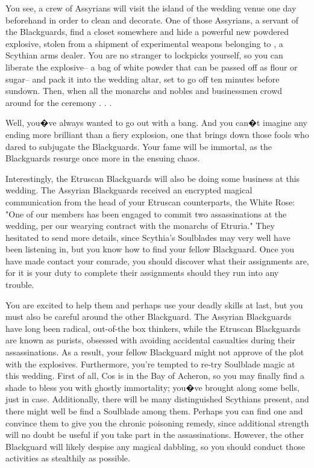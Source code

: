 \documentclass[char]{Kos}
\begin{document}
You see, a crew of Assyrians will visit the island of the wedding venue one day beforehand in order to clean and decorate. One of those Assyrians, a servant of the Blackguards, find a closet somewhere and hide a powerful new powdered explosive, stolen from a shipment of experimental weapons belonging to \cArmsDealer{\name}, a Scythian arms dealer. You are no stranger to lockpicks yourself, so you can liberate the explosive-- a bag of white powder that can be passed off as flour or sugar-- and pack it into the wedding altar, set to go off ten minutes before sundown. Then, when all the monarchs and nobles and businessmen crowd around for the ceremony . . .

Well, you�ve always wanted to go out with a bang. And you can�t imagine any ending more brilliant than a fiery explosion, one that brings down those fools who dared to subjugate the Blackguards. Your fame will be immortal, as the Blackguards resurge once more in the ensuing chaos.

Interestingly, the Etruscan Blackguards will also be doing some business at this wedding. The Assyrian Blackguards received an encrypted magical communication from the head of your Etruscan counterparts, the White Rose: "One of our members has been engaged to commit two assassinations at the wedding, per our wearying contract with the monarchs of Etruria." They hesitated to send more details, since Scythia's Soulblades may very well have been listening in, but you know how to find your fellow Blackguard. Once you have made contact your comrade, you should discover what their assignments are, for it is your duty to complete their assignments should they run into any trouble.

You are excited to help them and perhaps use your deadly skills at last, but you must also be careful around the other Blackguard. The Assyrian Blackguards have long been radical, out-of-the box thinkers, while the Etruscan Blackguards are known as purists, obsessed with avoiding accidental casualties during their assassinations. As a result, your fellow Blackguard might not approve of the plot with the explosives. Furthermore, you're tempted to re-try Soulblade magic at this wedding. First of all, Cos is in the Bay of Acheron, so you may finally find a shade to bless you with ghostly immortality; you�ve brought along some bells, just in case. Additionally, there will be many distinguished Scythians present, and there might well be find a Soulblade among them. Perhaps you can find one and convince them to give you the chronic poisoning remedy, since additional strength will no doubt be useful if you take part in the assassinations. However, the other Blackguard will likely despise any magical dabbling, so you should conduct those activities as stealthily as possible.
\end{document}

